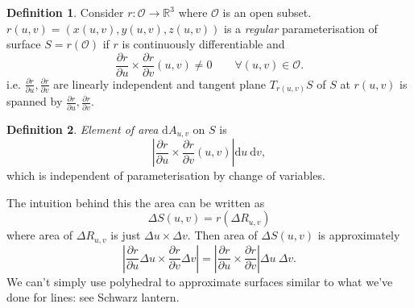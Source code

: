 \documentclass[a4paper]{article}
\theoremstyle{definition}
\newtheorem{defn}{Definition}[subsection]
\begin{document}
\begin{defn}
Consider $r:\mathcal O\rightarrow \mathbb R^3$ where $\mathcal O$ is an open subset. $r(u,v) = (x(u,v),y(u,v),z(u,v))$ is a \textit{regular} parameterisation of surface $S=r(\mathcal O)$ if
$r$ is continuously differentiable and \[
\frac{\partial r}{\partial u} \times \frac{\partial r}{\partial v} (u,v) \neq 0 \qquad \forall (u,v) \in \mathcal O .
\]
i.e. $\displaystyle \frac{\partial r}{\partial u}, \frac{\partial r}{\partial v}$ are linearly independent and tangent plane $T_{r(u,v)}S$ of $S$ at $r(u,v)$ is spanned by $\displaystyle \frac{\partial r}{\partial u}, \frac{\partial r}{\partial v}$.
\end{defn}
\begin{defn}
\textit{Element of area} $\mathrm d A_{u,v}$ on $S$ is
\[
\left| \frac{\partial r}{\partial u} \times \frac{\partial r}{\partial v} (u,v) \right|  \mathrm d u \ \mathrm d v ,
\]
which is independent of parameterisation by change of variables.
\end{defn}
The intuition behind this the area can be written as
\[
\Delta S(u,v) = r(\Delta R_{u,v})
\]
where area of $\Delta R_{u,v}$ is just $\Delta u \times \Delta v.$ Then area of $\Delta S(u,v)$ is approximately
\[
\left| \frac{\partial r}{\partial u}\Delta u \times \frac{\partial r}{\partial v}\Delta v\right|=\left| \frac{\partial r}{\partial u} \times \frac{\partial r}{\partial v}\right|\Delta u\ \Delta v .
\]
We can't simply use polyhedral to approximate surfaces similar to what we've done for lines: see Schwarz lantern.
\end{document}
